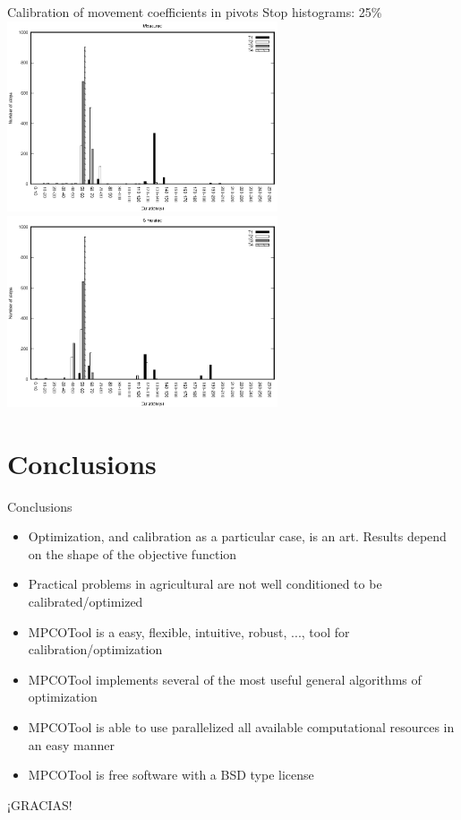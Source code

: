 \documentclass[10pt]{beamer}
\begin{document}
\begin{frame}{Calibration of movement coefficients in pivots}
{Stop histograms: 25\%}
	\includegraphics[width=0.60\textwidth]{pivot-measured-stops-25.eps}\\
	\includegraphics[width=0.60\textwidth]{pivot-simulated-stops-25.eps}
\end{frame}

\section{Conclusions}

\begin{frame}{Conclusions}
\begin{itemize}
	\item Optimization, and calibration as a particular case, is an art. Results
		depend on the shape of the objective function
	\item Practical problems in agricultural are not well conditioned to be
		calibrated/optimized
	\item MPCOTool is a easy, flexible, intuitive, robust, ..., tool for
		calibration/optimization
	\item MPCOTool implements several of the most useful general algorithms of
		optimization
	\item MPCOTool is able to use parallelized all available computational
		resources in an easy manner
	\item MPCOTool is free software with a BSD type license
\end{itemize}
\end{frame}

\begin{frame}
	\begin{center}
		\LARGE ¡GRACIAS!\\
	\end{center}
\end{frame}
\end{document}
